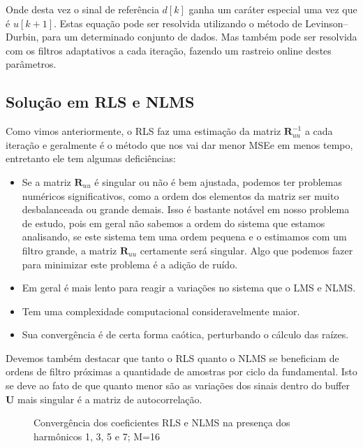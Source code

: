 \documentclass[a4paper, 12pt]{book}
\begin{document}
Onde desta vez o sinal de referência $d[k]$ ganha um caráter especial uma vez que é $u[k+1]$. Estas equação pode ser resolvida utilizando o método de Levinson–Durbin, para um determinado conjunto de dados. Mas também pode ser resolvida com os filtros adaptativos a cada iteração, fazendo um rastreio online destes parâmetros.

\subsection{Solução em RLS e NLMS}

Como vimos anteriormente, o RLS faz uma estimação da matriz $\boldsymbol{R}_{uu}^{-1}$ a cada iteração e geralmente é o método que nos vai dar menor MSEe em menos tempo, entretanto ele tem algumas deficiências:

\begin{itemize}
	\item Se a matriz $\boldsymbol{R}_{uu}$ é singular ou não é bem ajustada, podemos ter problemas numéricos significativos, como a ordem dos elementos da matriz ser muito desbalanceada ou grande demais. Isso é bastante notável em nosso problema de estudo, pois em geral não sabemos a ordem do sistema que estamos analisando, se este sistema tem uma ordem pequena e o estimamos com um filtro grande, a matriz $\boldsymbol{R}_{uu}$ certamente será singular. Algo que podemos fazer para minimizar este problema é a adição de ruído.
	\item Em geral é mais lento para reagir a variações no sistema que o LMS e NLMS.
	\item Tem uma complexidade computacional consideravelmente maior.
	\item Sua convergência é de certa forma caótica, perturbando o cálculo das raízes.
\end{itemize}

Devemos também destacar que tanto o RLS quanto o NLMS se beneficiam de ordens de filtro próximas a quantidade de amostras por ciclo da fundamental. Isto se deve ao fato de que quanto menor são as variações dos sinais dentro do buffer $\boldsymbol{U}$ mais singular é a matriz de autocorrelação. 

\begin{figure}[h]
	\centering    
	\def\svgwidth{\columnwidth}
	
	\caption{Convergência dos coeficientes RLS e NLMS na presença dos harmônicos 1, 3, 5 e 7; M=16}
	\label{fig:your image label}
\end{figure}
\end{document}
